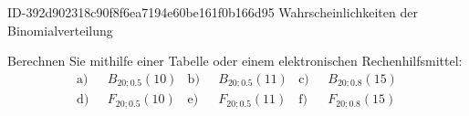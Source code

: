\begin{exercise}
      {ID-392d902318c90f8f6ea7194e60be161f0b166d95}
      {Wahrscheinlichkeiten der Binomialverteilung}
  \ifproblem\problem\par
    Berechnen Sie mithilfe einer Tabelle oder einem elektronischen
    Rechenhilfsmittel:
    \begin{align*}
        \text{a)~~}&B_{20;\num{0.5}}(10)
      & \text{b)~~}&B_{20;\num{0.5}}(11)
      & \text{c)~~}&B_{20;\num{0.8}}(15) \\
        \text{d)~~}&F_{20;\num{0.5}}(10)
      & \text{e)~~}&F_{20;\num{0.5}}(11)
      & \text{f)~~}&F_{20;\num{0.8}}(15)
    \end{align*}
  \fi
\end{exercise}
